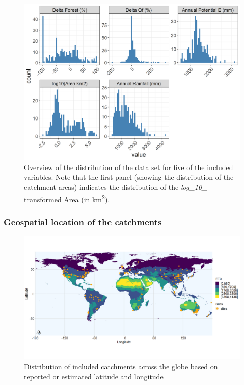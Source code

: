 \documentclass[]{elsarticle} %
\begin{document}
\begin{figure}
\includegraphics[width=0.9\linewidth]{./DataExploration} \caption{Overview of the distribution of the data set for five of the included variables. Note that the first panel (showing the distribution of the catchment areas) indicates the distribution of the \emph{log\_10\_} transformed Area (in km\textsuperscript{2}).}\label{fig:datagraphs}
\end{figure}

\hypertarget{geospatial-location-of-the-catchments}{%
\subsubsection{Geospatial location of the catchments}\label{geospatial-location-of-the-catchments}}

\begin{figure}
\includegraphics[width=0.9\linewidth]{FAOET0data_final_2022} \caption{Distribution of included catchments across the globe based on reported or estimated latitude and longitude}\label{fig:globalmap}
\end{figure}
\end{document}
